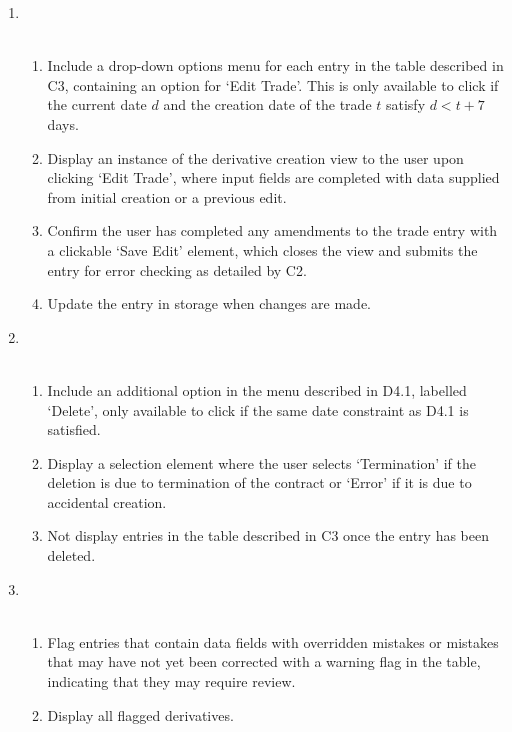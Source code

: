 \documentclass[8pt]{extarticle}
\begin{document}
\begin{enumerate}[label=C\arabic*]
\item \\\
\begin{enumerate}[label=D4.\arabic*]
\item Include a drop-down options menu for each entry in the table described in C3, containing an option for ‘Edit Trade’. This is only available to click if the current date $d$ and the creation date of the trade $t$ satisfy $d < t + 7$ days. 

\item Display an instance of the derivative creation view to the user upon clicking ‘Edit Trade’, where input fields are completed with data supplied from initial creation or a previous edit. 

\item Confirm the user has completed any amendments to the trade entry with a clickable ‘Save Edit’ element, which closes the view and submits the entry for error checking as detailed by C2. 

\item Update the entry in storage when changes are made. 
\end{enumerate}

\item \\\
\begin{enumerate}[label=D5.\arabic*]
\item Include an additional option in the menu described in D4.1, labelled ‘Delete’, only available to click if the same date constraint as D4.1 is satisfied. 

\item Display a selection element where the user selects ‘Termination’ if the deletion is due to termination of the contract or ‘Error’ if it is due to accidental creation. 

\item Not display entries in the table described in C3 once the entry has been deleted.
\end{enumerate}

\item \\\
\begin{enumerate}[label=D6.\arabic*]
\item Flag entries that contain data fields with overridden mistakes or mistakes that may have not yet been corrected with a warning flag in the table, indicating that they may require review. 

\item Display all flagged derivatives. 
\end{enumerate}


\end{enumerate}
\end{document}
